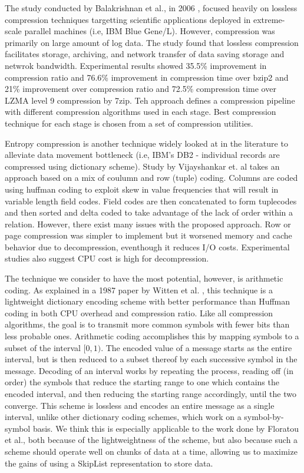 \documentclass[twocolumn]{article}
\begin{document}
The study conducted by Balakrishnan et al., in 2006 \cite{ref:lossless-cluster},
focused heavily on lossless compression techniques targetting scientific applications
deployed in extreme-scale parallel machines (i.e, IBM Blue Gene/L). However, 
compression was primarily on large amount of log data. The study found that lossless
compression facilitates storage, archiving, and network transfer of data saving 
storage and netwrok bandwidth. Experimental results showed 35.5\% improvement in 
compression ratio and 76.6\% improvement in compression time over bzip2 and 21\% 
improvement over compression ratio and 72.5\% compression time over LZMA level 9 
compression by 7zip. Teh approach defines a compression pipeline with different 
compression algorithms used in each stage. Best compression technique for each 
stage is chosen from a set of compression utilities.

Entropy compression is another technique widely looked at in the literature 
to alleviate data movement bottleneck (i.e, IBM's DB2 - individual records are 
compressed using dictionary scheme). Study by Vijayshankar et. al 
\cite{ref:entropy-compression} takes an approach based on a mix of coulumn and 
row (tuple) coding. Columns are coded using huffman coding to exploit skew in 
value frequencies that will result in variable length field codes. Field codes 
are then concatenated to form tuplecodes and then sorted and delta coded to take 
advantage of the lack of order within a relation. However, there exist many 
issues with the proposed approach. Row or page compression was simpler to implement 
but it worsened memory and cache behavior due to decompression, eventhough it 
reduces I/O costs. Experimental studies also suggest CPU cost is high for decompression.

The technique we consider to have the most potential, however, is arithmetic
coding.  As explained in a 1987 paper by Witten et al. \cite{ref:arith}, this
technique is a lightweight dictionary encoding scheme with better performance
than Huffman coding \cite{ref:huffman} in both CPU overhead and compression ratio. 
Like all compression algorithms, the goal is to transmit more common symbols
with fewer bits than less probable ones.  Arithmetic coding accomplishes
this by mapping symbols to a subset of the interval $ [0, 1) $.  The encoded
value of a message starts as the entire interval, but is then
reduced to a subset thereof by each successive symbol in the message.
Decoding of an interval works by repeating the process, reading off (in order)
the symbols that reduce the starting range to one which contains the encoded
interval, and then reducing the starting range accordingly, until the two
converge.  This scheme is lossless and encodes an entire message as a single
interval, unlike other dictionary coding schemes, which work on a
symbol-by-symbol basis.  We think this is especially applicable to the
work done by Floratou et al., both because of the lightweightness of the
scheme, but also because such a scheme should operate well on chunks of data
at a time, allowing us to maximize the gains of using a SkipList representation
to store data.
\end{document}

